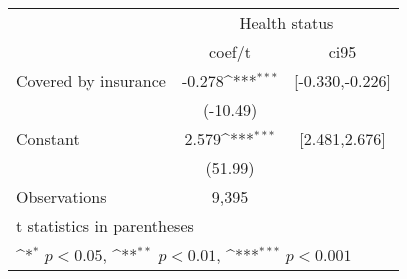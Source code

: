 {
\def\sym#1{\ifmmode^{#1}\else\(^{#1}\)\fi}
\begin{tabular}{l*{1}{cc}}
\hline\hline
                &\multicolumn{2}{c}{Health status}\\
                &   coef/t         &     ci95\\
\hline
Covered by insurance&   -0.278\sym{***}&[-0.330,-0.226]\\
                & (-10.49)         &         \\
Constant        &    2.579\sym{***}&[2.481,2.676]\\
                &  (51.99)         &         \\
\hline
Observations    &    9,395         &         \\
\hline\hline
\multicolumn{3}{l}{\footnotesize t statistics in parentheses}\\
\multicolumn{3}{l}{\footnotesize \sym{*} \(p<0.05\), \sym{**} \(p<0.01\), \sym{***} \(p<0.001\)}\\
\end{tabular}
}
